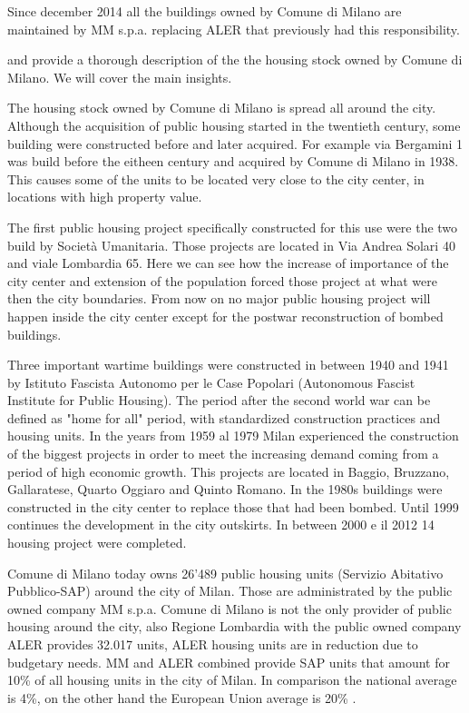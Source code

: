 \documentclass[11pt, titlepage]{article}
\begin{document}
Since december 2014 all the buildings owned by Comune di Milano are maintained by MM s.p.a. replacing ALER that previously had this responsibility.

\cite{breda_tua_2016} and \cite{Breda} provide a thorough description of the the housing stock owned by Comune di Milano. We will cover the main insights. 

The housing stock owned by Comune di Milano is spread all around the city. Although the acquisition of public housing started in the twentieth century, some building were constructed before and later acquired. For example via Bergamini 1 was build before the eitheen century and acquired by Comune di Milano in 1938. This causes some of the units to be located very close to the city center, in locations with high property value. 

The first public housing project specifically constructed for this use were the two build by Società Umanitaria. Those projects are located in Via Andrea Solari 40 and viale Lombardia 65. Here we can see how the increase of importance of the city center and extension of the population forced those project at what were then the city boundaries. From now on no major public housing project will happen inside the city center except for the postwar reconstruction of bombed buildings.

Three important wartime buildings were constructed in between 1940 and 1941 by Istituto Fascista Autonomo per le Case Popolari (Autonomous Fascist Institute for Public Housing). The period after the second world war can be defined as "home for all"  period, with standardized construction practices and housing units. In the years from 1959 al 1979 Milan experienced the construction of the biggest projects in order to meet the increasing demand coming from a period of high economic growth. This projects are located in Baggio, Bruzzano, Gallaratese, Quarto Oggiaro and Quinto Romano. In the 1980s buildings were constructed in the city center to replace those that had been bombed. Until 1999 continues the development in the city outskirts. In between  2000 e il 2012 14 housing project were completed. 

Comune di Milano today owns 26'489  public housing units (Servizio
Abitativo Pubblico-SAP) around the city of Milan. Those are administrated by the public owned company MM s.p.a. Comune di Milano is not the only provider of public housing around the city, also Regione Lombardia with the public owned company ALER provides 32.017 units, ALER housing units are in reduction due to budgetary needs. MM and ALER combined provide SAP units that amount for 10\% of all housing units in the city of Milan. In comparison the national average is 4\%, on the other hand the European Union average is 20\% \parencite{comune2023}.
\end{document}
